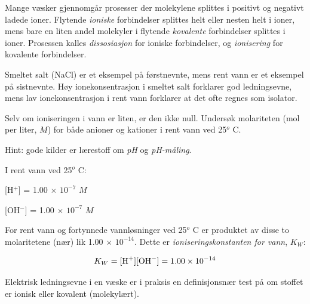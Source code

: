 

Mange væsker gjennomgår prosesser der molekylene splittes i positivt og negativt ladede ioner. Flytende {\it ioniske} forbindelser splittes helt eller nesten helt i ioner, mens bare en liten andel molekyler i flytende {\it kovalente} forbindelser splittes i ioner. Prosessen kalles {\it dissosiasjon} for ioniske forbindelser, og {\it ionisering} for kovalente forbindelser.

Smeltet salt (NaCl) er et eksempel på førstnevnte, mens rent vann er et eksempel på sistnevnte. Høy ionekonsentrasjon i smeltet salt forklarer god ledningsevne, mens lav ionekonsentrasjon i rent vann forklarer at det ofte regnes som isolator.

Selv om ioniseringen i vann er liten, er den ikke null. Undersøk molariteten (mol per liter, $M$) for både anioner og kationer i rent vann ved 25$^{o}$ C.

\vskip 10pt

Hint: gode kilder er lærestoff om {\it pH} og {\it pH-måling}.







\noindent
I rent vann ved 25$^{o}$ C:

\vskip 10pt

[H$^{+}$] = 1.00 $\times$ $10^{-7}$ $M$

\vskip 10pt

[OH$^{-}$] = 1.00 $\times$ $10^{-7}$ $M$

\vskip 10pt

For rent vann og fortynnede vannløsninger ved 25$^{o}$ C er produktet av disse to molaritetene (nær) lik 1.00 $\times$ $10^{-14}$. Dette er {\it ioniseringskonstanten for vann}, $K_W$:

$$K_W = [\hbox{H}^{+}] [\hbox{OH}^{-}] = 1.00 \times 10^{-14}$$







Elektrisk ledningsevne i en væske er i praksis en definisjonsnær test på om stoffet er ionisk eller kovalent (molekylært).



